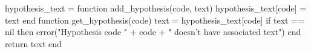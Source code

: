 \usepackage{turnipcite}



\RequirePackage{amsthm}
\theoremstyle{definition}
\newtheorem{definition}{Definition}[chapter]
\newtheorem{example}{Example}[chapter]




\RequirePackage[small,bf]{caption}



\RequirePackage{subcaption}
\RequirePackage{adjustbox}




\usepackage[capitalize,nameinlink]{cleveref}
\usepackage{crossreftools}

\let\ORGhypersetup\hypersetup
\protected\def\hypersetup{\ORGhypersetup}


\setcounter{hypI}{0}
\renewcommand{\thehypI}{H-\arabic{hypI}}
\newcommand{\newhyp}{%
    \refstepcounter{hypI}%
    \thehypI%
}

\begin{luacode*}
hypothesis_text = {}
function add_hypothesis(code, text)
    hypothesis_text[code] = text
end
function get_hypothesis(code)
    text = hypothesis_text[code]
    if text == nil then
        error("Hypothesis code " + code + " doesn't have associated text")
    end
    return text
end
\end{luacode*}
\newcommand{\sethyptext}[2]{\luadirect{add_hypothesis(\luastring{#1}, \luastring{#2})}}
\newcommand{\gethyptext}[1]{\luadirect{tex.sprint(get_hypothesis(\luastring{#1}))}}

